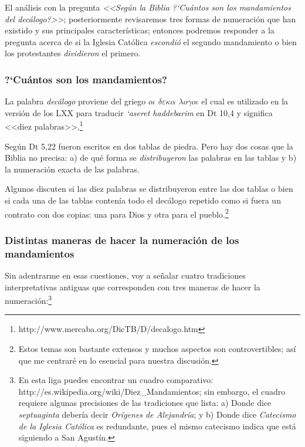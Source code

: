 \documentclass{article}
\begin{document}
\noindent
El an\'alisis con la pregunta \emph{<<Seg\'un la Biblia ?`Cu\'antos son los mandamientos del dec\'alogo?>>}; posteriormente revisaremos tres formas de numeraci\'on que han existido y sus principales caracter\'{i}sticas; entonces podremos responder a la pregunta acerca de si la Iglesia Cat\'olica \emph{escondi\'o} el segundo mandamiento o bien los protestantes \emph{dividieron} el primero.

\subsubsection{?`Cu\'antos son los mandamientos?}

La palabra \emph{dec\'alogo} proviene del griego \emph{$o \iota$ $ \delta\varepsilon\kappa\alpha$ $\lambda o \gamma o \iota$} el cual es utilizado en la versi\'on de los LXX para traducir \emph{{\lq}aseret haddebarim} en Dt 10,4 y significa <<diez palabras>>.\footnote{http://www.mercaba.org/DicTB/D/decalogo.htm}

Seg\'un Dt 5,22 fueron escritos en dos tablas de piedra. Pero hay dos cosas que la Biblia no precisa: a) de qu\'e forma se \emph{distribuyeron} las palabras en las tablas y b) la numeraci\'on exacta de las palabras.

Algunos discuten si las diez palabras se distribuyeron entre las dos tablas o bien si cada una de las tablas conten\'{i}a todo el dec\'alogo repetido como si fuera un contrato con dos copias: una para Dios y otra para el pueblo.\footnote{Estos temas son bastante extensos y muchos aspectos son controvertibles; as\'{i} que me centrar\'e en lo esencial para nuestra discusi\'on.}

\subsubsection{Distintas maneras de hacer la numeraci\'on de los mandamientos}

Sin adentrarme en esas cuestiones, voy a se\~nalar cuatro tradiciones interpretativas antiguas que corresponden con tres maneras de hacer la numeraci\'on:\footnote{En esta liga puedes encontrar un cuadro comparativo: http://es.wikipedia.org/wiki/Diez\_Mandamientos; sin embargo, el cuadro requiere algunas precisiones de las tradiciones que lista: a) Donde dice \emph{septuaginta} deber\'{i}a decir \emph{Or\'{i}genes de Alejandr\'{i}a}; y b) Donde dice \emph{Catecismo de la Iglesia Cat\'olica} es redundante, pues el mismo catecismo indica que est\'a siguiendo a San Agust\'{i}n.}
\end{document}
